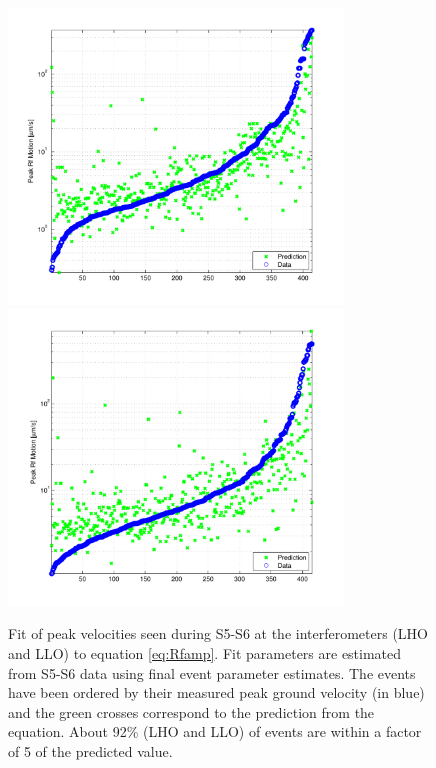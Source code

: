 \documentclass[reprint, prl, aps, showpacs]{revtex4-1}
\begin{document}
\begin{figure}[t]
\hspace*{-0.5cm}
 \includegraphics[width=3.5in]{Prediction_LHO_S5_S6.pdf}
 \includegraphics[width=3.5in]{Prediction_LLO_S5_S6.pdf}
 \caption{Fit of peak velocities seen during S5-S6 at the interferometers (LHO and LLO) to equation \ref{eq:Rfamp}.  Fit parameters are estimated from S5-S6 data using final event parameter estimates. The events have been ordered by their measured peak ground velocity (in blue) and the green crosses correspond to the prediction from the equation. About 92\% (LHO and LLO) of events are within a factor of 5 of the predicted value.}
 \label{fig:regression}
\end{figure}
\end{document}
